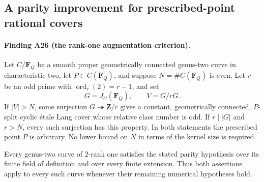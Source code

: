 \subsection{A parity improvement for prescribed-point rational covers}
\label{sec:rank-one-augmentation}

\paragraph{Finding A26 (the rank-one augmentation criterion).}
Let $C/\mathbf F_Q$ be a smooth proper geometrically connected
genus-two curve in characteristic two, let $P\in C(\mathbf F_Q)$,
and suppose $N=\#C(\mathbf F_Q)$ is even.
Let $r$ be an odd prime with $\operatorname{ord}_r(2)=r-1$, and set
\[
 G=J_C(\mathbf F_Q),\qquad V=G/rG.
\tag{RA.1}
\]
If $|V|>N$, some surjection $G\twoheadrightarrow\mathbf Z/r$
gives a constant, geometrically connected, $P$-split cyclic
\'etale Lang cover whose relative class number is odd.
If $r\mid|G|$ and $r>N$, every such surjection has this property.
In both statements the prescribed point $P$ is arbitrary.
No lower bound on $N$ in terms of the kernel size is required.

Every genus-two curve of $2$-rank one satisfies the stated
parity hypothesis over its finite field of definition and
over every finite extension.  Thus both assertions apply
to every such curve whenever their remaining numerical
hypotheses hold.

